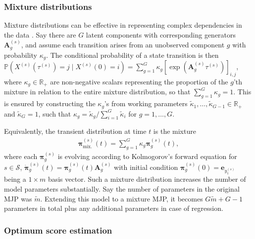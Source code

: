\documentclass{article}
\providecommand{\DIFadd}[1]{{\protect\color{blue} \sf #1}} %
\providecommand{\DIFaddend}{} %
\begin{document}
\subsubsection{\DIFadd{Mixture distributions}} \label{sec:mixture}
\DIFadd{Mixture distributions can be effective in representing complex dependencies in the data \citep{frydman2024,Bisgaard2026}.
Say there are $G$ latent components with corresponding generators $\bm A_g^{(s)}$, and assume each transition arises from an unobserved component $g$ with probability $\kappa_g$.
The conditional probability of a state transition is then
$
\mathbb P\left( X^{(s)}(\tau^{(s)}) = j \mid X^{(s)}(0) = i \right) = \sum_{g = 1}^G \kappa_g \left[ \exp( \bm A_g^{(s)} \tau^{(s)}) \right]_{i,j}
$, where $\kappa_g \in \mathbb R_+$ are non-negative scalars representing the proportion of the $g$'th mixture in relation to the entire mixture distribution, so that $ \sum_{g = 1}^G \kappa_g = 1$. This is ensured by constructing the $\kappa_g$'s from working parameters $\tilde\kappa_1,\dots,\tilde\kappa_{G-1}\in\mathbb R_+$ and $\tilde\kappa_G = 1$, such that $\kappa_g = \widetilde{\kappa}_g / \sum_{i=1}^G \widetilde{\kappa}_i$ for $g = 1, \dots, G$.
}

\DIFadd{Equivalently, the transient distribution at time $t$ is the mixture
}\begin{align}
\bm\pi_{\text{mix.}}^{(s)}(t) = \sum_{g = 1}^G \kappa_g \bm\pi_g^{(s)}(t), \label{eq:mixture}
\end{align}
\DIFadd{where each $\bm\pi_g^{(s)}$ is evolving according to Kolmogorov's forward equation for $s \in \mathcal S$, $\Dot{\bm{\pi}}_g^{(s)}(t) = \bm{\pi}_g^{(s)}(t) \bm{A}^{(s)}_g$ with initial condition $\bm \pi_g^{(s)}(0) = \bm e_{y_1^{(s)}}$ being a $1\times m$ basis vector.
Such a mixture distribution increases the number of model parameters substantially. Say the number of parameters in the original MJP was $\widetilde{m}$. Extending this model to a mixture MJP, it becomes $G \widetilde{m} + G-1$ parameters in total plus any additional parameters in case of regression. 
}




\DIFaddend \subsubsection{Optimum score estimation}\label{sec:optimum_score_estimation}
\end{document}
